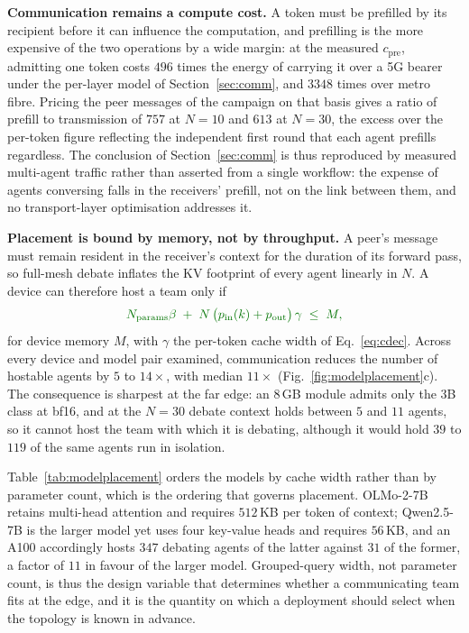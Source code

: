 \documentclass[journal]{IEEEtran}
\newif\ifshowchanges \showchangestrue
\newcommand{\OLD}{\ifshowchanges\color{black}\fi}
\newcommand{\ROOF}{\ifshowchanges\color{green!45!black}\fi}
\begin{document}
\ROOF{}\textbf{Communication remains a compute cost.} A token must be prefilled by its recipient
before it can influence the computation, and prefilling is the more expensive of the two operations by a
wide margin: at the measured $c_{\mathrm{pre}}$, admitting one token costs $496$ times the energy
of carrying it over a 5G bearer under the per-layer model of Section~\ref{sec:comm}, and $3348$
times over metro fibre. Pricing the peer messages of the campaign on that basis gives a ratio of
prefill to transmission of $757$ at $N=10$ and $613$ at $N=30$, the excess over the per-token
figure reflecting the independent first round that each agent prefills regardless. The conclusion
of Section~\ref{sec:comm} is thus reproduced by measured multi-agent traffic rather than asserted
from a single workflow: the expense of agents conversing falls in the receivers' prefill, not on
the link between them, and no transport-layer optimisation addresses it.

\ROOF{}\textbf{Placement is bound by memory, not by throughput.} A peer's message must remain resident in
the receiver's context for the duration of its forward pass, so full-mesh debate inflates the KV
footprint of every agent linearly in $N$. A device can therefore host a team only if
%
\begin{equation}\ROOF{}
N_{\mathrm{params}}\beta \;+\; N\,\big(p_{\mathrm{in}}(k)+p_{\mathrm{out}}\big)\,\gamma
\;\le\; M ,
\label{eq:placementmem}
\end{equation}
%
for device memory $M$, with $\gamma$ the per-token cache width of Eq.~\eqref{eq:cdec}. Across every
device and model pair examined, communication reduces the number of hostable agents by $5$ to
$14\times$, with median $11\times$ (Fig.~\ref{fig:modelplacement}c). The consequence is sharpest at
the far edge: an $8$\,GB module admits only the $3$B class at bf16, and at the $N=30$ debate
context holds between $5$ and $11$ agents, so it cannot host the team with which it is debating,
although it would hold $39$ to $119$ of the same agents run in isolation.

\ROOF{}Table~\ref{tab:modelplacement} orders the models by cache width rather than by parameter count,
which is the ordering that governs placement. OLMo-2-7B retains multi-head attention and requires
$512$\,KB per token of context; Qwen2.5-7B is the larger model yet uses four key-value heads and
requires $56$\,KB, and an A100 accordingly hosts $347$ debating agents of the latter against $31$
of the former, a factor of $11$ in favour of the larger model. Grouped-query width, not parameter
count, is thus the design variable that determines whether a communicating team fits at the edge,
and it is the quantity on which a deployment should select when the topology is known in advance.
\endgroup\OLD{}
\end{document}
